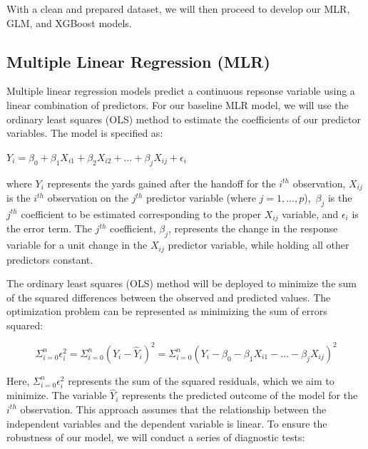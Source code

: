 \documentclass[
  super,
  preprint,
  3p]{elsarticle}
\begin{document}
With a clean and prepared dataset, we will then proceed to develop our
MLR, GLM, and XGBoost models.

\hypertarget{multiple-linear-regression-mlr}{%
\subsection{Multiple Linear Regression
(MLR)}\label{multiple-linear-regression-mlr}}

Multiple linear regression models predict a continuous repsonse variable
using a linear combination of predictors. For our baseline MLR model, we
will use the ordinary least squares (OLS) method to estimate the
coefficients of our predictor variables. The model is specified as:

\(Y_i = \beta_0 + \beta_1X_{i1} + \beta_2X_{i2} + \ldots + \beta_jX_{ij} + \epsilon_i\)

where \(Y_i\) represents the yards gained after the handoff for the
\(i^{th}\) observation, \(X_{ij}\) is the \(i^{th}\) observation on the
\(j^{th}\) predictor variable (where \(j = 1, ..., p\)),~\(\beta_j\) is
the \(j^{th}\) coefficient to be estimated corresponding to the proper
\(X_{ij}\) variable, and \(\epsilon_i\) is the error term. The
\(j^{th}\) coefficient, \(\beta_j\), represents the change in the
response variable for a unit change in the \(X_{ij}\) predictor
variable, while holding all other predictors constant.

The ordinary least squares (OLS) method will be deployed to minimize the
sum of the squared differences between the observed and predicted
values. The optimization problem can be represented as minimizing the
sum of errors squared:

\[
\Sigma_{i=0}^n \epsilon_i^2 = \Sigma_{i=0}^n (Y_i - \hat{Y}_i)^2 = \Sigma_{i=0}^n (Y_i - \beta_0 - \beta_1X_{i1} - \ldots - \beta_jX_{ij})^2
\]

Here, \(\Sigma_{i=0}^n \epsilon_i^2\) represents the sum of the squared
residuals, which we aim to minimize. The variable \(\hat{Y}_i\)
represents the predicted outcome of the model for the \(i^{th}\)
observation. This approach assumes that the relationship between the
independent variables and the dependent variable is linear. To ensure
the robustness of our model, we will conduct a series of diagnostic
tests:
\end{document}
